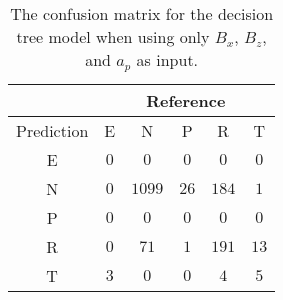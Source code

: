 \begin{table}[!ht]
	\centering
	\begin{tabular}{|c|c|c|c|c|c|}
		\hline
		 & \multicolumn{5}{|c|}{Reference} \\ \hline
		 Prediction & E & N & P & R & T \\ \hline
		 E & $0$ & $0$ & $0$ & $0$ & $0$ \\ \hline
		 N & $0$ & $1099$ & $26$ & $184$ & $1$ \\ \hline
		 P & $0$ & $0$ & $0$ & $0$ & $0$ \\ \hline
		 R & $0$ & $71$ & $1$ & $191$ & $13$ \\ \hline
		 T & $3$ & $0$ & $0$ & $4$ & $5$ \\ \hline
	\end{tabular}
	\caption{The confusion matrix for the decision tree model when using only $B_{x}$, $B_{z}$, and $a_{p}$ as input.}
	\label{tab:cm:xzap:C5.0}
\end{table}
